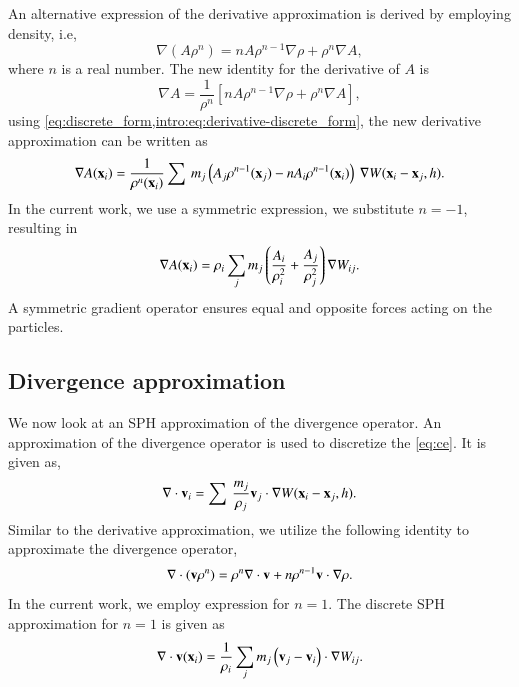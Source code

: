An alternative expression of the derivative approximation is derived by employing
density, i.e,
\begin{equation}
  \label{intro:eq:sph-continu-derivative-final}
  \nabla (A \rho^n) = n A \rho^{n - 1} \nabla \rho + \rho^n \nabla A,
\end{equation}
where $n$ is a real number. The new identity for the derivative of $A$ is
\begin{equation}
  \nabla A = \frac{1}{\rho^n} \left[ n A \rho^{n - 1} \nabla \rho + \rho^n \nabla A  \right],
\end{equation}
using \cref{eq:discrete_form,intro:eq:derivative-discrete_form}, the new
derivative approximation can be written as
\begin{equation}
  \label{intro:eq:derivative-discrete_form}
  \nabla A(\mathbf{x}_i) = \frac{1}{\rho^n(\mathbf{x}_i)} \sum\>
  m_j \left(A_j \rho^{n-1}(\mathbf{x}_j) - n A_i \rho^{n-1}(\mathbf{x}_i) \right)\> \nabla W(\mathbf{x}_i - \mathbf{x}_j, h).
\end{equation}
In the current work, we use a symmetric expression, we substitute $n=-1$, resulting in
\begin{equation}
  \nabla A(\mathbf{x}_i) = \rho_i \sum_{j} m_j \left(\frac{A_i}{\rho_i^2} + \frac{A_j}{\rho_j^2}\right) \nabla W_{ij}.
\end{equation}
A symmetric gradient operator ensures equal and opposite forces acting on the
particles.


\subsection{Divergence approximation}
We now look at an SPH approximation of the divergence operator. An approximation
of the divergence operator is used to discretize the \cref{eq:ce}. It is given
as,
\begin{equation}
  \label{intro:eq:discrete_derivative}
  \nabla \cdot \mathbf{v}_i = \sum\> \frac{m_j}{\rho_j} \mathbf{v}_j \cdot \nabla W(\mathbf{x}_i - \mathbf{x}_j, h).
\end{equation}
Similar to the derivative approximation, we utilize the following identity to approximate the divergence operator,
\begin{equation}
  \label{intro:eq:sph-continu-div-intermediate}
  \nabla \cdot (\mathbf{v} \rho^n) = \rho^n \nabla \cdot \mathbf{v} + n  \rho^{n - 1} \mathbf{v} \cdot \nabla \rho.
\end{equation}
In the current work, we employ expression for $n=1$. The discrete SPH approximation for $n=1$ is given as
\begin{equation}
  \label{intro:eq:sph-continu-div-final}
  \nabla \cdot \mathbf{v}(\mathbf{x}_i) = \frac{1}{\rho_i} \sum_{j} m_j \left(\mathbf{v}_j - \mathbf{v}_i\right) \cdot \nabla W_{ij}.
\end{equation}


